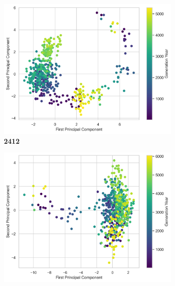 \begin{figure}[!ht]
            \begin{subfigure}{\textwidth}
                \centering
                \begin{minipage}{0.32\textwidth}
                    \includegraphics[width=\textwidth]{./resources/generalist_3_2412/pca_scatterplot.png}
                    \centering
                    \textbf{2412}
                \end{minipage}
                \hfill
                \begin{minipage}{0.32\textwidth}
                    \includegraphics[width=\textwidth]{./resources/generalist_4_2784/pca_scatterplot.png}
                    \centering

\end{minipage}
\end{subfigure}
\end{figure}
